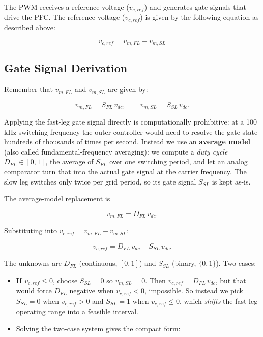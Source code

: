 \documentclass[11pt]{article}
\providecommand{\tightlist}{%
      \setlength{\itemsep}{0pt}\setlength{\parskip}{0pt}}
\begin{document}
    The PWM receives a reference voltage (\(v_{c, ref}\)) and generates gate
signals that drive the PFC. The reference voltage (\(v_{c, ref}\))
is given by the following equation as described above:

\[
v_{c, ref} = v_{m, FL} - v_{m, SL}
\]

    \hypertarget{gate-signal-derivation}{%
\subsection{Gate Signal Derivation}\label{gate-signal-derivation}}

    Remember that \(v_{m, FL}\) and \(v_{m, SL}\) are given by:

\[
v_{m, FL} = S_{FL} \, v_{dc}, \qquad v_{m, SL} = S_{SL} \, v_{dc}.
\]

Applying the fast-leg gate signal directly is computationally
prohibitive: at a 100 kHz switching frequency the outer controller would
need to resolve the gate state hundreds of thousands of times per
second. Instead we use an \textbf{average model} (also called
fundamental-frequency averaging): we compute a \emph{duty cycle}
\(D_{FL} \in [0,1]\), the average of \(S_{FL}\) over one switching
period, and let an analog comparator turn that into the actual gate
signal at the carrier frequency. The slow leg switches only twice per
grid period, so its gate signal \(S_{SL}\) is kept as-is.

The average-model replacement is

\[
v_{m,FL} = D_{FL} \, v_{dc}.
\]

Substituting into \(v_{c, ref} = v_{m, FL} - v_{m, SL}\):

\[
v_{c, ref} = D_{FL}\, v_{dc} - S_{SL}\, v_{dc}.
\]

The unknowns are \(D_{FL}\) (continuous, \([0,1]\)) and \(S_{SL}\)
(binary, \(\{0,1\}\)). Two cases:

\begin{itemize}
\tightlist
\item
  \textbf{If \(v_{c, ref} \leq 0\)}, choose \(S_{SL} = 0\) so
  \(v_{m,SL} = 0\). Then \(v_{c,ref} = D_{FL}\, v_{dc}\), but that would
  force \(D_{FL}\) negative when \(v_{c,ref}<0\), impossible. So
  instead we pick \(S_{SL} = 0\) when \(v_{c,ref} > 0\) and
  \(S_{SL} = 1\) when \(v_{c,ref} \leq 0\), which \emph{shifts} the
  fast-leg operating range into a feasible interval.
\item
  Solving the two-case system gives the compact form:
\end{itemize}
\end{document}
